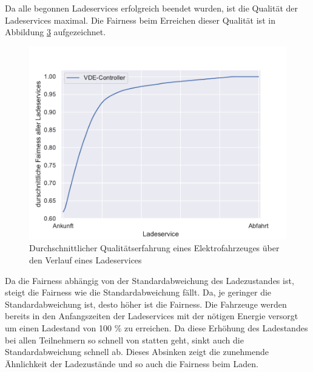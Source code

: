 \begin{figure}
\begin{subfigure}{0.49\linewidth}
        \label{ABB_VDEtauSocSTD}
	\end{subfigure}
\end{figure}

Da alle begonnen Ladeservices erfolgreich beendet wurden, ist die Qualität der Ladeservices maximal. Die Fairness beim Erreichen dieser Qualität ist in Abbildung \ref{Abb_VDEtauFairness} aufgezeichnet. \\
\begin{figure}[htb]
\centering
	\includegraphics[scale=0.6]{img/VDE_tau/tau_VDE_2_qoe.pdf}
	\caption{Durchschnittlicher Qualitätserfahrung eines Elektrofahrzeuges über den Verlauf eines Ladeservices}
	\label{Abb_VDEtauFairness}
\end{figure}

Da die Fairness abhängig von der Standardabweichung des Ladezustandes ist, steigt die Fairness wie die Standardabweichung fällt. Da, je geringer die Standardabweichung ist, desto höher ist die Fairness. Die Fahrzeuge werden bereits in den Anfangszeiten der Ladeservices mit der nötigen Energie versorgt um einen Ladestand von 100 \% zu erreichen. Da diese Erhöhung des Ladestandes bei allen Teilnehmern so schnell von statten geht, sinkt auch die Standardabweichung schnell ab. Dieses Absinken zeigt die zunehmende Ähnlichkeit der Ladezustände und so auch die Fairness beim Laden.

